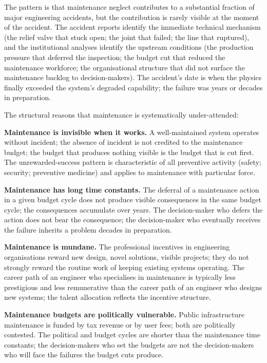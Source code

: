 The pattern is that maintenance neglect contributes to a substantial fraction of major engineering accidents, but the contribution is rarely visible at the moment of the accident. The accident reports identify the immediate technical mechanism (the relief valve that stuck open; the joint that failed; the line that ruptured), and the institutional analyses identify the upstream conditions (the production pressure that deferred the inspection; the budget cut that reduced the maintenance workforce; the organisational structure that did not surface the maintenance backlog to decision-makers). The accident's date is when the physics finally exceeded the system's degraded capability; the failure was years or decades in preparation.

The structural reasons that maintenance is systematically under-attended:

\textbf{Maintenance is invisible when it works.} A well-maintained system operates without incident; the absence of incident is not credited to the maintenance budget; the budget that produces nothing visible is the budget that is cut first. The unrewarded-success pattern is characteristic of all preventive activity (safety; security; preventive medicine) and applies to maintenance with particular force.

\textbf{Maintenance has long time constants.} The deferral of a maintenance action in a given budget cycle does not produce visible consequences in the same budget cycle; the consequences accumulate over years. The decision-maker who defers the action does not bear the consequence; the decision-maker who eventually receives the failure inherits a problem decades in preparation.

\textbf{Maintenance is mundane.} The professional incentives in engineering organisations reward new design, novel solutions, visible projects; they do not strongly reward the routine work of keeping existing systems operating. The career path of an engineer who specialises in maintenance is typically less prestigious and less remunerative than the career path of an engineer who designs new systems; the talent allocation reflects the incentive structure.

\textbf{Maintenance budgets are politically vulnerable.} Public infrastructure maintenance is funded by tax revenue or by user fees; both are politically contested. The political and budget cycles are shorter than the maintenance time constants; the decision-makers who set the budgets are not the decision-makers who will face the failures the budget cuts produce.

